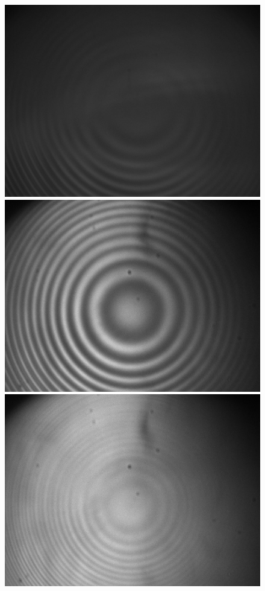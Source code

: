 \documentclass{article}
\begin{document}
\begin{figure}[H] %
    \centering
    \includegraphics[scale = 0.1]{0.jpg}
    \includegraphics[scale = 0.1]{1.jpg}
    \includegraphics[scale = 0.1]{2.jpg}

\end{figure}
\end{document}

